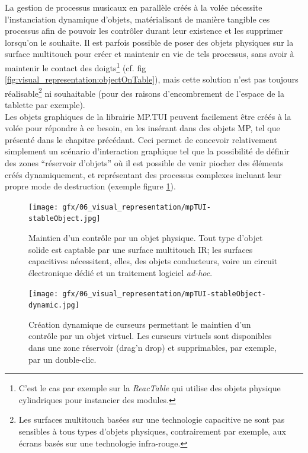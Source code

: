 \noindent La gestion de processus musicaux en parallèle créés à la volée nécessite l'instanciation dynamique d'objets, matérialisant de manière tangible ces processus afin de pouvoir les contrôler durant leur existence et les supprimer lorsqu'on le souhaite. Il est parfois possible de poser des objets physiques sur la surface multitouch pour créer et maintenir en vie de tels processus, sans avoir à maintenir le contact des doigts\footnote{C'est le cas par exemple sur la \textit{ReacTable} qui utilise des objets physique cylindriques pour instancier des modules.} (cf. fig \ref{fig:visual_representation:objectOnTable}), mais cette solution n'est pas toujours réalisable\footnote{Les surfaces multitouch basées sur une technologie capacitive ne sont pas sensibles à tous types d'objets physiques, contrairement par exemple, aux écrans basés sur une technologie infra-rouge.} ni souhaitable (pour des raisons d'encombrement de l'espace de la tablette par exemple).\\
\indent Les objets graphiques de la librairie MP.TUI peuvent facilement être créés à la volée pour répondre à ce besoin, en les insérant dans des objets MP, tel que présenté dans le chapitre précédant. Ceci permet de concevoir relativement simplement un scénario d'interaction graphique tel que la possibilité de définir des zones ``réservoir d'objets'' où il est possible de venir piocher des éléments créés dynamiquement, et représentant des processus complexes incluant leur propre mode de destruction (exemple figure \ref{fig:visual_representation:dynamicInstanciation}).
\begin{figure}[!htbp]
	\captionsetup{format=plain}%
	\centering
	\begin{minipage}[t]{0.48\textwidth}
		\texttt{[image: gfx/06\_visual\_representation/mpTUI-stableObject.jpg]}
		\caption[Maintien d'un contrôle par un objet physique]{Maintien d'un contrôle par un objet physique. Tout type d'objet solide est captable par une surface multitouch IR; les surfaces capacitives nécessitent, elles, des objets conducteurs, voire un circuit électronique dédié et un traitement logiciel \textit{ad-hoc}.}
		\label{fig:visual_representation:objectOnTable}
	\end{minipage}
	\hspace{.02\linewidth}
	\begin{minipage}[t]{0.48\textwidth}
	    \texttt{[image: gfx/06\_visual\_representation/mpTUI-stableObject-dynamic.jpg]}
		\caption[Maintien d'un contrôle par un objet virtuel]{Création dynamique de curseurs permettant le maintien d'un contrôle par un objet virtuel. Les curseurs virtuels sont disponibles dans une zone réservoir (drag'n drop) et supprimables, par exemple, par un double-clic.}
		\label{fig:visual_representation:dynamicInstanciation}
	\end{minipage}
\end{figure}

